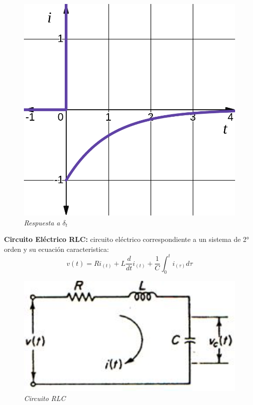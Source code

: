 \documentclass[12pt,a4paper]{report}
\begin{document}
\begin{enumerate}[label=\alph*)]
\begin{figure}[h]
\begin{minipage}[h]{0.4\textwidth}
          \includegraphics[width=1\textwidth]{./images/ej4.3.png}
          \textit{Respuesta a $\delta_t$}
        \end{minipage}
      \end{figure}

  \end{enumerate}

  \newpage
  \textbf{Circuito Eléctrico RLC:} circuito eléctrico correspondiente a un sistema de 2° orden y su ecuación
  caracteristica:
  \begin{equation*}
    v(t) = Ri_{(t)} + L \frac{d}{dt} i_{(t)} + \frac{1}{C} \int_{0}^{t} i_{(\tau)} d\tau
  \end{equation*}

  \vspace{-1cm}
  \noindent
  \begin{figure}[h]
    \centering
    \begin{minipage}[h]{0.5\textwidth}
      \centering
      \includegraphics[width=1\textwidth]{./images/ej4.5.jpg}
      \textit{Circuito RLC}
    \end{minipage}
  \end{figure}
\end{document}
